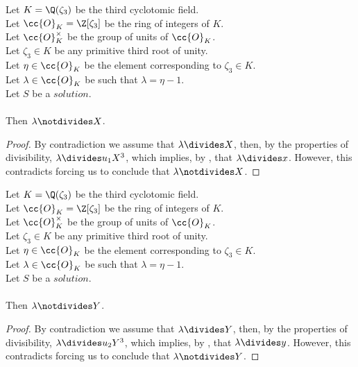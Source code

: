 \begin{lemma}
  \label{lmm:lambda_not_dvd_X}
  \leanok
  Let $K = \Q(\zeta_3)$ be the third cyclotomic field. \\
  Let $\cc{O}_K = \Z[\zeta_3]$ be the ring of integers of $K$. \\
  Let $\cc{O}^\times_K$ be the group of units of $\cc{O}_K$. \\
  Let $\zeta_3 \in K$ be any primitive third root of unity. \\
  Let $\eta \in \cc{O}_K$ be the element corresponding to $\zeta_3 \in K$. \\
  Let $\lambda \in \cc{O}_K$ be such that $\lambda = \eta -1$. \\
  Let $S$ be a $solution$.\\\\
  Then $\lambda \notdivides X$.
\end{lemma}
\begin{proof}
  \leanok
  By contradiction we assume that $\lambda \divides X$, then, by the properties of divisibility,
  $\lambda \divides u_1 X^3$, which implies, by ,
  that $\lambda \divides x$.
  However, this contradicts 
  forcing us to conclude that $\lambda \notdivides X$.
\end{proof}

\begin{lemma}
  \label{lmm:lambda_not_dvd_Y}
  \leanok
  Let $K = \Q(\zeta_3)$ be the third cyclotomic field. \\
  Let $\cc{O}_K = \Z[\zeta_3]$ be the ring of integers of $K$. \\
  Let $\cc{O}^\times_K$ be the group of units of $\cc{O}_K$. \\
  Let $\zeta_3 \in K$ be any primitive third root of unity. \\
  Let $\eta \in \cc{O}_K$ be the element corresponding to $\zeta_3 \in K$. \\
  Let $\lambda \in \cc{O}_K$ be such that $\lambda = \eta -1$. \\
  Let $S$ be a $solution$.\\\\
  Then $\lambda \notdivides Y$.
\end{lemma}
\begin{proof}
  \leanok
  By contradiction we assume that $\lambda \divides Y$, then, by the properties of divisibility,
  $\lambda \divides u_2 Y^3$, which implies, by ,
  that $\lambda \divides y$.
  However, this contradicts 
  forcing us to conclude that $\lambda \notdivides Y$.
\end{proof}

